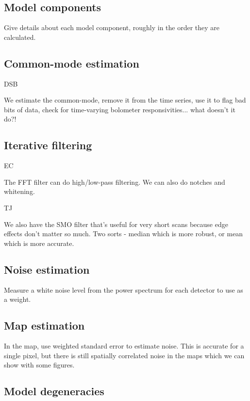 \documentclass[useAMS,usenatbib,nofootinbib]{mn2e}
\begin{document}
\subsection{Model components}

Give details about each model component, roughly in the order they are
calculated.

\subsection{Common-mode estimation}

DSB

We estimate the common-mode, remove it from the time series, use it to
flag bad bits of data, check for time-varying bolometer
responsivities... what doesn't it do?!

\subsection{Iterative filtering}

EC

The FFT filter can do high/low-pass filtering. We can also do notches
and whitening.

TJ

We also have the SMO filter that's useful for very short scans
because edge effects don't matter so much. Two sorts - median which is
more robust, or mean which is more accurate.


\subsection{Noise estimation}

Measure a white noise level from the power spectrum for each detector
to use as a weight.

\subsection{Map estimation}

In the map, use weighted standard error to estimate noise. This is
accurate for a single pixel, but there is still spatially correlated
noise in the maps which we can show with some figures.

\subsection{Model degeneracies}
\end{document}
